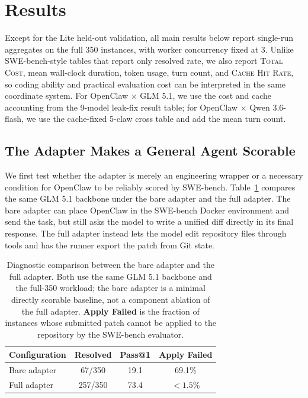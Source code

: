 
\section{Results}\label{sec:results}

Except for the Lite held-out validation, all main results below report single-run aggregates on the full 350 instances, with worker concurrency fixed at 3. Unlike SWE-bench-style tables that report only resolved rate, we also report \textsc{Total Cost}, mean wall-clock duration, token usage, turn count, and \textsc{Cache Hit Rate}, so coding ability and practical evaluation cost can be interpreted in the same coordinate system. For OpenClaw $\times$ GLM 5.1, we use the cost and cache accounting from the 9-model leak-fix result table; for OpenClaw $\times$ Qwen 3.6-flash, we use the cache-fixed 5-claw cross table and add the mean turn count.

\subsection{The Adapter Makes a General Agent Scorable}\label{sec:adapter_diagnostic}

We first test whether the adapter is merely an engineering wrapper or a necessary condition for OpenClaw to be reliably scored by SWE-bench. Table~\ref{tab:adapter_diagnostic} compares the same GLM 5.1 backbone under the bare adapter and the full adapter. The bare adapter can place OpenClaw in the SWE-bench Docker environment and send the task, but still asks the model to write a unified diff directly in its final response. The full adapter instead lets the model edit repository files through tools and has the runner export the patch from Git state.

\begin{table}[t]
  \centering
  \scriptsize
  \renewcommand{\arraystretch}{1.0}
  \setlength{\tabcolsep}{4pt}
  \caption{Diagnostic comparison between the bare adapter and the full adapter. Both use the same GLM 5.1 backbone and the full-350 workload; the bare adapter is a minimal directly scorable baseline, not a component ablation of the full adapter. \textbf{Apply Failed} is the fraction of instances whose submitted patch cannot be applied to the repository by the SWE-bench evaluator.}
  \label{tab:adapter_diagnostic}
  \begin{tabular*}{0.95\linewidth}{@{\extracolsep{\fill}}lccc@{}}
    \toprule
    \textbf{Configuration} & \textbf{Resolved} & \textbf{Pass@1} & \textbf{Apply Failed} \\
    \midrule
    Bare adapter & 67/350 & 19.1 & 69.1\%\\
    Full adapter & 257/350 & 73.4 & $<1.5\%$ \\
    \bottomrule
  \end{tabular*}
\end{table}

